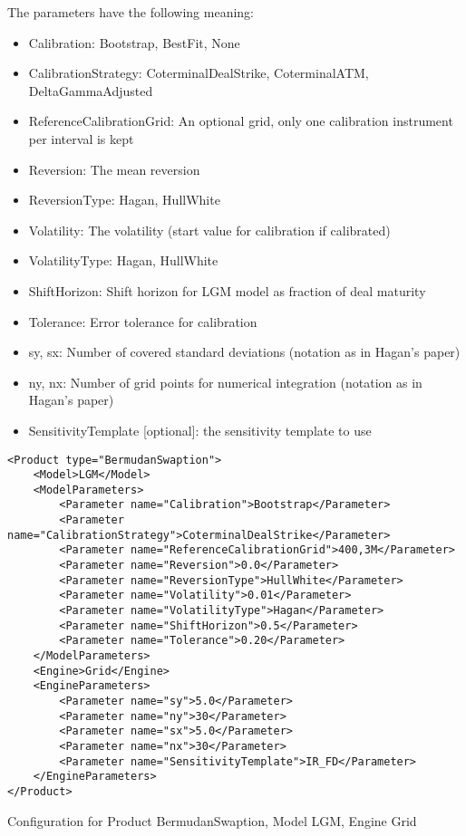 The parameters have the following meaning:

\begin{itemize}
\item Calibration: Bootstrap, BestFit, None
\item CalibrationStrategy: CoterminalDealStrike, CoterminalATM, DeltaGammaAdjusted
\item ReferenceCalibrationGrid: An optional grid, only one calibration instrument per interval is kept
\item Reversion: The mean reversion
\item ReversionType: Hagan, HullWhite
\item Volatility: The volatility (start value for calibration if calibrated)
\item VolatilityType: Hagan, HullWhite
\item ShiftHorizon: Shift horizon for LGM model as fraction of deal maturity
\item Tolerance: Error tolerance for calibration
\item sy, sx: Number of covered standard deviations (notation as in Hagan's paper)
\item ny, nx: Number of grid points for numerical integration (notation as in Hagan's paper)
\item SensitivityTemplate [optional]: the sensitivity template to use 
\end{itemize}

\begin{longlisting}
\begin{verbatim}
<Product type="BermudanSwaption">
    <Model>LGM</Model>
    <ModelParameters>
        <Parameter name="Calibration">Bootstrap</Parameter>
        <Parameter name="CalibrationStrategy">CoterminalDealStrike</Parameter>
        <Parameter name="ReferenceCalibrationGrid">400,3M</Parameter>
        <Parameter name="Reversion">0.0</Parameter>
        <Parameter name="ReversionType">HullWhite</Parameter>
        <Parameter name="Volatility">0.01</Parameter>
        <Parameter name="VolatilityType">Hagan</Parameter>
        <Parameter name="ShiftHorizon">0.5</Parameter>
        <Parameter name="Tolerance">0.20</Parameter>
    </ModelParameters>
    <Engine>Grid</Engine>
    <EngineParameters>
        <Parameter name="sy">5.0</Parameter>
        <Parameter name="ny">30</Parameter>
        <Parameter name="sx">5.0</Parameter>
        <Parameter name="nx">30</Parameter>
        <Parameter name="SensitivityTemplate">IR_FD</Parameter>
    </EngineParameters>
</Product>
\end{verbatim}
\caption{Configuration for Product BermudanSwaption, Model LGM, Engine Grid}
\label{lst:peconfig_BermudanSwaption_LGM_Grid}
\end{longlisting}

